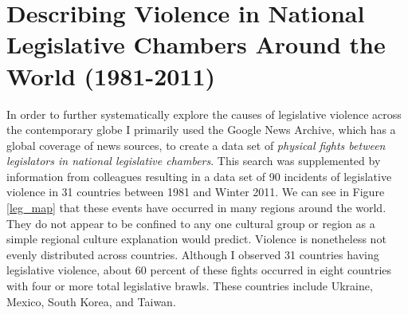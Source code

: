 \documentclass[a4paper]{article}\usepackage[]{graphicx}\usepackage[]{color}
\begin{document}
\section{Describing Violence in National Legislative Chambers Around the World (1981-2011)}

In order to further systematically explore the causes of legislative violence across the contemporary globe I primarily used the Google News Archive, which has a global coverage of news sources, to create a data set of {\emph{physical fights between legislators in national legislative chambers}}. This search was supplemented by information from colleagues resulting in a data set of 90 incidents of legislative violence in 31 countries between 1981 and Winter 2011. We can see in Figure \ref{leg_map} that these events have occurred in many regions around the world. They do not appear to be confined to any one cultural group or region as a simple regional culture explanation would predict. Violence is nonetheless not evenly distributed across countries. Although I observed 31 countries having legislative violence, about 60 percent of these fights occurred in eight countries with four or more total legislative brawls. These countries include Ukraine, Mexico, South Korea, and Taiwan. 
\end{document}

